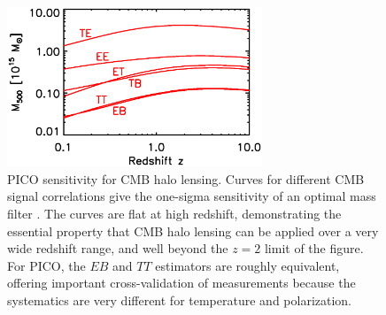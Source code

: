 \documentclass[PICOReport.tex]{subfiles}
\begin{document}
\begin{figure}[t]
\hspace{-0.1in}
\parbox{3.1in}{\centerline {
\includegraphics[width=3.0in]{images/m500lim_vs_z_pico_polar_v3.eps} } }
\hspace{0.in}
\parbox{3.4in}{
\caption{\captiontext 
PICO sensitivity for CMB halo lensing.  Curves for different CMB signal correlations give the one-sigma sensitivity of an optimal mass filter \citep{2015A&A...578A..21M}.  The curves are flat at high redshift, demonstrating the essential property that CMB halo lensing can be applied over a very wide redshift range, and well beyond the $z=2$ limit of the figure.  For PICO, the $EB$ and $TT$ estimators are roughly equivalent, offering important cross-validation of measurements because the systematics are very different for temperature and polarization. 
\label{fig:HaloLensing} 
} }
\vspace{-0.1in}
\end{figure}
\end{document}
